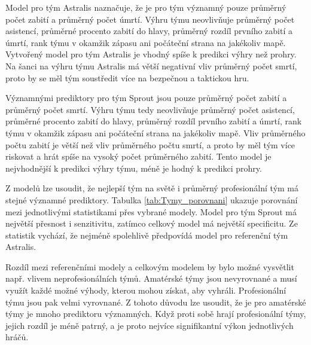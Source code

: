 Model pro tým Astralis naznačuje, že je pro tým významný pouze průměrný počet zabití a průměrný počet úmrtí. Výhru týmu neovlivňuje průměrný počet asistencí, průměrné
procento zabití do hlavy, průměrný rozdíl prvního zabití a úmrtí, rank týmu v okamžik zápasu ani počáteční strana na jakékoliv mapě. Vytvořený model pro tým
Astralis je vhodný spíše k predikci výhry než prohry. Na šanci na výhru týmu Astralis má větší negativní vliv průměrný počet smrtí, proto by se měl tým soustředit více
na bezpečnou a taktickou hru.

Významnými prediktory pro tým Sprout jsou pouze průměrný počet zabití a průměrný počet smrtí. Výhru týmu tedy neovlivňuje průměrný počet asistencí, průměrné
procento zabití do hlavy, průměrný rozdíl prvního zabití a úmrtí, rank týmu v okamžik zápasu ani počáteční strana na jakékoliv mapě. Vliv průměrného počtu zabití je větší než 
vliv průměrného počtu smrtí, a proto by měl tým více riskovat a hrát spíše na vysoký počet průměrného zabití. Tento model je nejvhodnější k predikci výhry týmu, méně je 
hodný k predikci prohry.



Z modelů lze usoudit, že nejlepší tým na světě i průměrný
profesionální tým má stejné významné prediktory. Tabulka \ref{tab:Tymy_porovnani} ukazuje porovnání mezi jednotlivými statistikami přes vybrané modely. Model pro tým
Sprout má největší přesnost  i senzitivitu, zatímco celkový model má největší specificitu. Ze statistik vychází, že nejméně spolehlivě předpovídá model pro
referenční tým Astralis. 

Rozdíl mezi referenčními modely a celkovým modelem by bylo možné vysvětlit např. vlivem neprofesionálních týmů. Amatérské týmy jsou nevyrovnané a musí využít každé možné výhody,
kterou mohou získat, aby vyhráli. Profesionální týmu jsou pak velmi vyrovnané. Z tohoto důvodu lze usoudit, že je pro amatérské týmy je mnoho prediktoru významných. Když proti sobě hrají profesionální týmy, jejich rozdíl je
méně patrný, a je proto nejvíce signifikantní výkon jednotlivých hráčů.